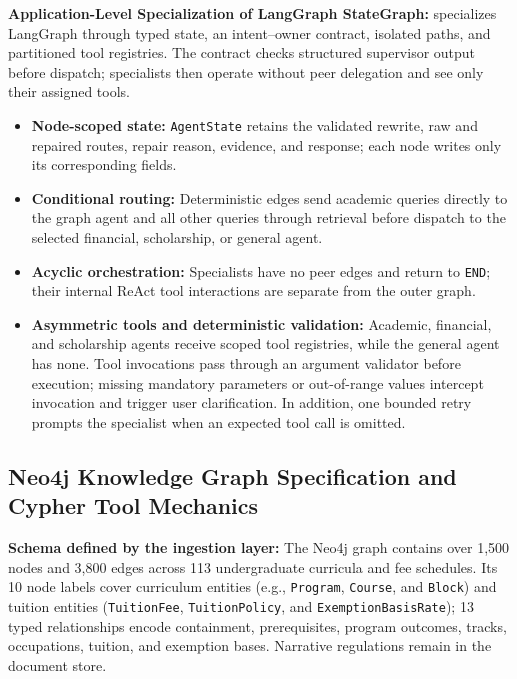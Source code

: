 \textbf{Application-Level Specialization of LangGraph StateGraph:}
\system{} specializes LangGraph through typed state, an intent--owner contract, isolated paths, and partitioned tool registries. The contract checks structured supervisor output before dispatch; specialists then operate without peer delegation and see only their assigned tools.
\begin{itemize}
    \setlength{\itemsep}{1.5pt}
    \setlength{\parsep}{0pt}
    \setlength{\parskip}{0pt}
    \item \textbf{Node-scoped state:} \texttt{AgentState} retains the validated rewrite, raw and repaired routes, repair reason, evidence, and response; each node writes only its corresponding fields.
    
    \item \textbf{Conditional routing:} Deterministic edges send academic queries directly to the graph agent and all other queries through retrieval before dispatch to the selected financial, scholarship, or general agent.
    
    \item \textbf{Acyclic orchestration:} Specialists have no peer edges and return to \texttt{END}; their internal ReAct tool interactions are separate from the outer graph.
    
    \item \textbf{Asymmetric tools and deterministic validation:} Academic, financial, and scholarship agents receive scoped tool registries, while the general agent has none. Tool invocations pass through an argument validator before execution; missing mandatory parameters or out-of-range values intercept invocation and trigger user clarification. In addition, one bounded retry prompts the specialist when an expected tool call is omitted.
\end{itemize}

\subsection{Neo4j Knowledge Graph Specification and Cypher Tool Mechanics}
\label{sec:neo4j_graph}

\textbf{Schema defined by the ingestion layer:}
The Neo4j graph contains over 1,500 nodes and 3,800 edges across 113 undergraduate curricula and fee schedules. Its 10 node labels cover curriculum entities (e.g., \texttt{Program}, \texttt{Course}, and \texttt{Block}) and tuition entities (\texttt{TuitionFee}, \texttt{TuitionPolicy}, and \texttt{ExemptionBasisRate}); 13 typed relationships encode containment, prerequisites, program outcomes, tracks, occupations, tuition, and exemption bases. Narrative regulations remain in the document store.

